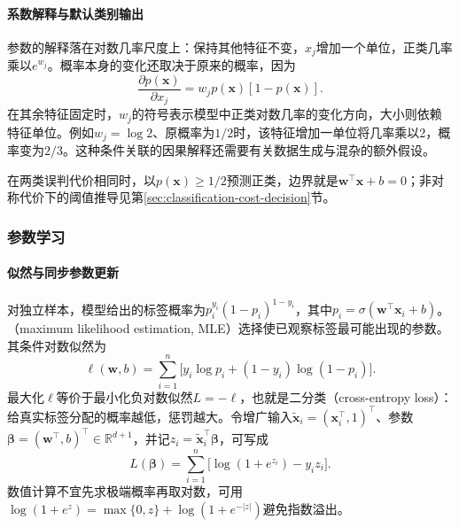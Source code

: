 \paragraph{系数解释与默认类别输出}
参数的解释落在对数几率尺度上：保持其他特征不变，$x_j$增加一个单位，正类几率乘以$e^{w_j}$。概率本身的变化还取决于原来的概率，因为
\[
  \frac{\partial p(\bm{x})}{\partial x_j}
  =w_jp(\bm{x})[1-p(\bm{x})].
\]
在其余特征固定时，$w_j$的符号表示模型中正类对数几率的变化方向，大小则依赖特征单位。例如$w_j=\log 2$、原概率为$1/2$时，该特征增加一单位将几率乘以2，概率变为$2/3$。这种条件关联的因果解释还需要有关数据生成与混杂的额外假设。

在两类误判代价相同时，以$p(\bm{x})\geq1/2$预测正类，边界就是$\bm{w}^{\top}\bm{x}+b=0$；非对称代价下的阈值推导见第\ref{sec:classification-cost-decision}节。

\subsubsection{参数学习}
\label{sec:classification-logistic-learning}

\paragraph{似然与同步参数更新}
对独立样本，模型给出的标签概率为$p_i^{y_i}(1-p_i)^{1-y_i}$，其中$p_i=\sigma(\bm{w}^{\top}\bm{x}_i+b)$。（maximum likelihood estimation, MLE）选择使已观察标签最可能出现的参数。其条件对数似然为
\begin{equation}
  \label{eq:classification-logistic-likelihood}
  \ell(\bm{w},b)
  =\sum_{i=1}^{n}
  \bigl[y_i\log p_i+(1-y_i)\log(1-p_i)\bigr].
\end{equation}
最大化$\ell$等价于最小化负对数似然$L=-\ell$，也就是二分类（cross-entropy loss）：给真实标签分配的概率越低，惩罚越大。令增广输入$\tilde{\bm{x}}_i=(\bm{x}_i^{\top},1)^{\top}$、参数$\bm{\beta}=(\bm{w}^{\top},b)^{\top}\in\mathbb{R}^{d+1}$，并记$z_i=\tilde{\bm{x}}_i^{\top}\bm{\beta}$，可写成
\begin{equation}
  \label{eq:classification-logistic-loss}
  L(\bm{\beta})
  =\sum_{i=1}^{n}\bigl[\log(1+e^{z_i})-y_i z_i\bigr].
\end{equation}
数值计算不宜先求极端概率再取对数，可用$\log(1+e^z)=\max\{0,z\}+\log(1+e^{-|z|})$避免指数溢出。

